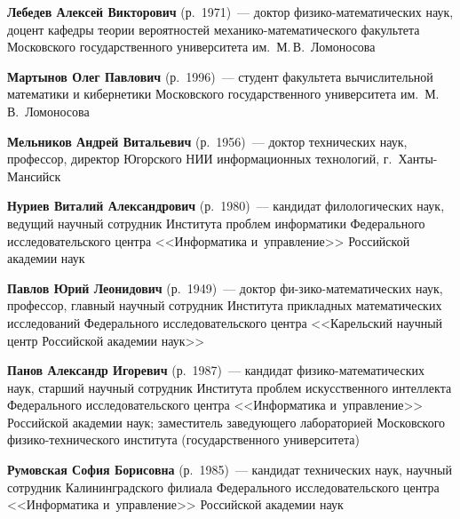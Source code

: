 \begin{multicols}{2}
\noindent
\textbf{Лебедев Алексей Викторович} (р.\ 1971)~--- 
доктор фи\-зи\-ко-ма\-те\-ма\-ти\-че\-ских наук, доцент кафедры теории 
вероятностей ме\-ха\-ни\-ко-ма\-те\-ма\-ти\-че\-ско\-го 
факультета Московского государственного 
университета им.\ М.\,В.~Ломоносова

\vspace*{3pt}

\noindent
\textbf{Мартынов Олег Павлович} (р.\ 1996)~---  студент факультета 
вычислительной математики и кибернетики Московского государственного университета 
им.\ М.\,В.~Ломоносова

\vspace*{3pt}

\noindent
\textbf{Мельников Андрей Витальевич} (р.\ 1956)~--- 
доктор технических наук, профессор, директор Югорского НИИ 
информационных технологий, г.~Хан\-ты-Ман\-сийск

\vspace*{3pt}

\noindent
\textbf{Нуриев Виталий Александрович} (р.\ 1980)~--- 
кан\-дидат филологических наук, ведущий научный сотруд\-ник Института проб\-лем 
информатики Федерального исследовательского центра <<Информатика и~управ\-ле\-ние>> 
Российской академии наук

\vspace*{3pt}

\noindent
\textbf{Павлов Юрий Леонидович} (р.\ 1949)~--- 
доктор фи-\linebreak зи\-ко-ма\-те\-ма\-ти\-че\-ских наук, профессор, главный\linebreak
 науч\-ный 
со\-труд\-ник Института прикладных математических исследований 
Федерального исследовательского центра <<Карельский научный центр 
Российской академии наук>>

\vspace*{3pt}

\noindent
\textbf{Панов Александр Игоревич} (р.\ 1987)~--- кандидат фи\-зи\-ко-ма\-те\-ма\-ти\-че\-ских 
наук, старший научный сотрудник Института проб\-лем искусственного интеллекта 
Федерального исследовательского центра <<Информатика и~управ\-ле\-ние>>
Российской академии наук; 
заместитель заведующего лабораторией Московского фи\-зи\-ко-тех\-ни\-че\-ско\-го 
института (государственного университета)

\vspace*{3pt}

\noindent
\textbf{Румовская София Борисовна} (р.\ 1985)~---
кандидат технических наук, научный сотрудник Калининградского филиала 
Федерального исследовательского центра <<Информатика и~управ\-ле\-ние>>
 Российской академии наук


\end{multicols}
